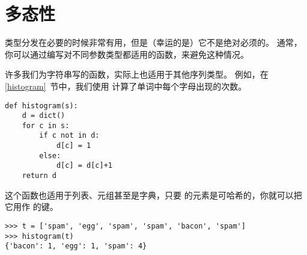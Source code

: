 \section{多态性}
\label{polymorphism}


类型分发在必要的时候非常有用，但是（幸运的是）它不是绝对必须的。
通常，你可以通过编写对不同参数类型都适用的函数，来避免这种情况。

  


许多我们为字符串写的函数，实际上也适用于其他序列类型。
例如，在 \ref{histogram}~节中，我们使用 
计算了单词中每个字母出现的次数。

\begin{lstlisting}
def histogram(s):
    d = dict()
    for c in s:
        if c not in d:
            d[c] = 1
        else:
            d[c] = d[c]+1
    return d
\end{lstlisting}

%

这个函数也适用于列表、元组甚至是字典，只要  的元素是可哈希的，你就可以把
它用作  的键。

\begin{lstlisting}
>>> t = ['spam', 'egg', 'spam', 'spam', 'bacon', 'spam']
>>> histogram(t)
{'bacon': 1, 'egg': 1, 'spam': 4}
\end{lstlisting}

%

